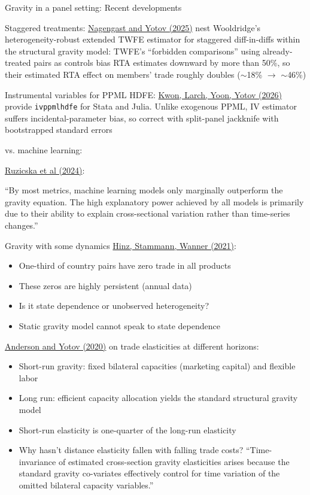 \documentclass[10pt,notes=hide,aspectratio=169]{beamer}
\begin{document}
\begin{frame}{Gravity in a panel setting: Recent developments}
\begin{itemize}
\item Staggered treatments: 
\href{https://doi.org/10.1257/app.20230089}{Nagengast and Yotov (2025)} nest Wooldridge's heterogeneity-robust extended TWFE estimator for staggered diff-in-diffs within the structural gravity model: TWFE's ``forbidden comparisons'' using already-treated pairs as controls bias RTA estimates downward by more than 50\%, so their estimated RTA effect on members' trade roughly doubles ($\sim$18\% $\to$ $\sim$46\%)
\item Instrumental variables for PPML HDFE:
\href{https://www.lebow.drexel.edu/sites/default/files/2026-04/cgpa_paper_2026_11-instrumental-variable.pdf}{Kwon, Larch, Yoon, Yotov (2026)}
provide \texttt{ivppmlhdfe} for Stata and Julia.
Unlike exogenous PPML, IV estimator suffers incidental-parameter bias, so correct with split-panel jackknife with bootstrapped standard errors
\item vs. machine learning: { \href{https://doi.org/10.1007/978-3-031-49849-7_16}{Ruzicska et al (2024)}: 
\item[] ``By most metrics, machine learning models only marginally outperform the gravity equation. The high explanatory power achieved by all models is primarily due to their ability to explain cross-sectional variation rather than time-series changes.''\par}
\end{itemize}
\end{frame}
\begin{frame}{Gravity with some dynamics}
\href{https://arxiv.org/abs/2004.12655}{Hinz, Stammann, Wanner (2021)}:
\begin{itemize}
\item One-third of country pairs have zero trade in all products
\item These zeros are highly persistent (annual data)
\item Is it state dependence or unobserved heterogeneity?
\item Static gravity model cannot speak to state dependence
\end{itemize}
\medskip
\href{https://doi.org/10.1016/j.jinteco.2020.103341}{Anderson and Yotov (2020)} on trade elasticities at different horizons:
\begin{itemize}
\item Short-run gravity: fixed bilateral capacities (marketing capital) and flexible labor
\item Long run: efficient capacity allocation yields the standard structural gravity model
\item Short-run elasticity is one-quarter of the long-run elasticity
\item Why hasn't distance elasticity fallen with falling trade costs? ``Time-invariance of estimated cross-section gravity elasticities arises because the standard gravity co-variates effectively control for time variation of the omitted bilateral capacity variables.''
\end{itemize}
\end{frame}
\end{document}
